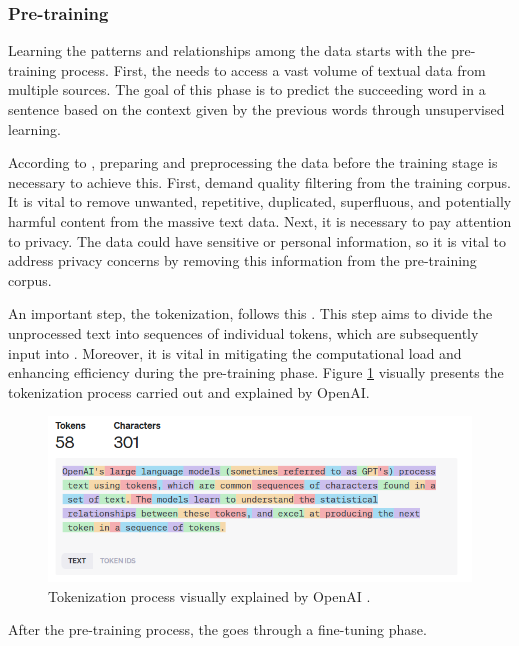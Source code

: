 \subsubsection{Pre-training}

Learning the patterns and relationships among the data starts with the pre-training process. First, the {\llm} needs to access a vast volume of textual data from multiple sources. The goal of this phase is to predict the succeeding word in a sentence based on the context given by the previous words through unsupervised learning. 

According to \citet{hadi_LLM_2023}, preparing and preprocessing the data before the training stage is necessary to achieve this. First, demand quality filtering from the training corpus. It is vital to remove unwanted, repetitive, duplicated, superfluous, and potentially harmful content from the massive text data. Next, it is necessary to pay attention to privacy. The data could have sensitive or personal information, so it is vital to address privacy concerns by removing this information from the pre-training corpus.

An important step, the tokenization, follows this \cite{hadi_LLM_2023}. This step aims to divide the unprocessed text into sequences of individual tokens, which are subsequently input into {\llm}. Moreover, it is vital in mitigating the computational load and enhancing efficiency during the pre-training phase. Figure \ref{fig_tokenization} visually presents the tokenization process carried out and explained by OpenAI.

\begin{figure}[ht]
    \includegraphics[width=14cm]{figs/chapter2/tokenization.png}
    \centering
    \caption{Tokenization process visually explained by OpenAI \cite{noauthor_openai_nodate}.}
    \label{fig_tokenization}
\end{figure}

After the pre-training process, the {\llm} goes through a fine-tuning phase.



